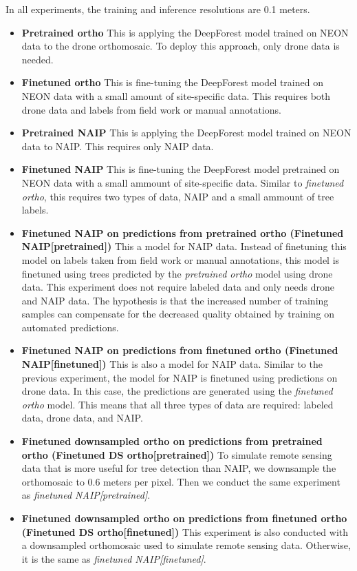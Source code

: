 In all experiments, the training and inference resolutions are 0.1 meters.

\begin{itemize}
    \item \textbf{Pretrained ortho} This is applying the DeepForest model trained on NEON data to the drone orthomosaic. To deploy this approach, only drone data is needed.
    \item \textbf{Finetuned ortho} This is fine-tuning the DeepForest model trained on NEON data with a small amount of site-specific data. This requires both drone data and labels from field work or manual annotations.
    \item \textbf{Pretrained NAIP} This is applying the DeepForest model trained on NEON data to NAIP. This requires only NAIP data.
    \item \textbf{Finetuned NAIP} This is fine-tuning the DeepForest model pretrained on NEON data with a small ammount of site-specific data. Similar to \textit{finetuned ortho}, this requires two types of data, NAIP and a small ammount of tree labels.
    \item \textbf{Finetuned NAIP on predictions from pretrained ortho (Finetuned NAIP[pretrained])} 
    This a model for NAIP data. Instead of finetuning this model on labels taken from field work or manual annotations, this model is finetuned using trees predicted by the \textit{pretrained ortho} model using drone data. This experiment does not require labeled data and only needs drone and NAIP data. The hypothesis is that the increased number of training samples can compensate for the decreased quality obtained by training on automated predictions.
    \item \textbf{Finetuned NAIP on predictions from finetuned ortho (Finetuned NAIP[finetuned])}
    This is also a model for NAIP data. Similar to the previous experiment, the model for NAIP is finetuned using predictions on drone data. In this case, the predictions are generated using the \textit{finetuned ortho} model. This means that all three types of data are required: labeled data, drone data, and NAIP.
    \item \textbf{Finetuned downsampled ortho on predictions from pretrained ortho (Finetuned DS ortho[pretrained])}
    To simulate remote sensing data that is more useful for tree detection than NAIP, we downsample the orthomosaic to 0.6 meters per pixel. Then we conduct the same experiment as \textit{finetuned NAIP[pretrained]}.
    \item \textbf{Finetuned downsampled ortho on predictions from finetuned ortho (Finetuned DS ortho[finetuned])} This experiment is also conducted with a downsampled orthomosaic used to simulate remote sensing data. Otherwise, it is the same as \textit{finetuned NAIP[finetuned]}.
    
\end{itemize}

